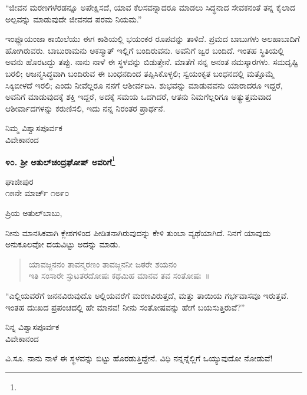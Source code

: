 “ಜೀವನ ಮರಣಗಳೆರಡನ್ನೂ ಅಪೇಕ್ಷಿಸದೆ, ಯಾವ ಕೆಲಸವನ್ನಾದರೂ ಮಾಡಲು ಸಿದ್ಧನಾದ ಸೇವಕನಂತೆ ತನ್ನ ಕೈಲಾದ ಅಲ್ಪವನ್ನು ಮಾಡುವುದೇ ಜೀವನದ ಪರಮ ನಿಯಮ.''

ಇಂಫ್ಲೂಯಂಜಾ ಕಾಯಿಲೆಯು ಈಗ ಕಾಶಿಯಲ್ಲಿ ಭಯಂಕರ ರೂಪವನ್ನು ತಾಳಿದೆ. ಪ್ರಮದ ಬಾಬುಗಳು ಅಲಹಾಬಾದಿಗೆ ಹೋಗಿರುವರು. ಬಾಬುರಾಮನು ಅಕಸ್ಮಾತ್ ಇಲ್ಲಿಗೆ ಬಂದಿರುವನು. ಅವನಿಗೆ ಜ್ವರ ಬಂದಿದೆ. ಇಂತಹ ಸ್ಥಿತಿಯಲ್ಲಿ ಅವನು ಹೊರಟದ್ದು ತಪ್ಪು. ನಾನು ನಾಳೆ ಈ ಸ್ಥಳವನ್ನು ಬಿಡುತ್ತೇನೆ. ಮಾತೆಗೆ ನನ್ನ ಅನಂತ ನಮಸ್ಕಾರಗಳು. ಸಮದೃಷ್ಟಿ ಬರಲಿ; ಆಜನ್ಮಸಿದ್ಧವಾಗಿ ಬಂದಿರುವ ಈ ಬಂಧನದಿಂದ ತಪ್ಪಿಸಿಕೊಳ್ಳಲಿ; ಸ್ವಯಂಕೃತ ಬಂಧನದಲ್ಲಿ ಮತ್ತೊಮ್ಮೆ ಸಿಕ್ಕಿಬೀಳದೆ ಇರಲಿ; ಎಂದು ನೀವೆಲ್ಲರೂ ನನಗೆ ಆಶೀರ್ವದಿಸಿ. ಶುಭವನ್ನು ಮಾಡುವವನು ಯಾರಾದರೂ ಇದ್ದರೆ, ಅವನಿಗೆ ಮಾಡುವುದಕ್ಕೆ ಶಕ್ತಿ ಇದ್ದರೆ, ಅದಕ್ಕೆ ಸಮಯ ಒದಗಿದರೆ, ಆತನು ನಿಮಗೆಲ್ಲರಿಗೂ ಅತ್ಯುತ್ತಮವಾದ ಆಶೀರ್ವಾದಗಳನ್ನು ಕರುಣಿಸಲಿ, ಇದು ನನ್ನ ನಿರಂತರ ಪ್ರಾರ್ಥನೆ.

\vspace{-0.5cm}

{\flushright
ನಿಮ್ಮ ವಿಶ್ವಾಸಪೂರ್ವಕ\\ವಿವೇಕಾನಂದ\par}

\begin{center}
\textbf{೪೦. ಶ‍್ರೀ ಅತುಲ್‌ಚಂದ್ರಘೋಷ್ ಅವರಿಗೆ}\footnote{}
\end{center}

\vspace{-0.5cm}

\begin{flushright}
ಘಾಜೀಪುರ\\೧೫ನೇ ಮಾರ್ಚ್ ೧೮೯೦
\end{flushright}

\noindent
ಪ್ರಿಯ ಅತುಲ್‌ಬಾಬು,

ನೀನು ಮಾನಸಿಕವಾಗಿ ಕ್ಲೇಶಗಳಿಂದ ಪೀಡಿತನಾಗಿರುವುದನ್ನು ಕೇಳಿ ತುಂಬಾ ವ್ಯಥೆಯಾಗಿದೆ. ನಿನಗೆ ಯಾವುದು ಅನುಕೂಲವೋ ದಯವಿಟ್ಟು ಅದನ್ನು ಮಾಡು.
\begin{verse}
 ಯಾವಜ್ಜನನಂ ತಾವನ್ಮರಣಂ ತಾವಜ್ಜನನೀ ಜಠರೇ ಶಯನಂ\\
 ಇತಿ ಸಂಸಾರೇ ಸ್ಫುಟತರದೋಷಃ ಕಥಮಿಹ ಮಾನವ ತವ ಸಂತೋಷಃ~॥ 
\end{verse}

“ಎಲ್ಲಿಯವರೆಗೆ ಜನನವಿರುವುದೊ ಅಲ್ಲಿಯವರೆಗೆ ಮರಣವಿರುತ್ತದೆ, ಮತ್ತು ತಾಯಿಯ ಗರ್ಭವಾಸವೂ ಇರುತ್ತವೆ. ಇಂತಹ ದುಃಖದ ಪ್ರಪಂಚದಲ್ಲಿ ಹೇ ಮಾನವ! ನೀನು ಸಂತೋಷವನ್ನು ಹೇಗೆ ಬಯಸುತ್ತಿರುವೆ?”

\vspace{-0.5cm}

\begin{flushright}
ನಿನ್ನ ವಿಶ್ವಾಸಪೂರ್ವಕ\\ವಿವೇಕಾನಂದ
\end{flushright}

ವಿ.ಸೂ. \enginline{-}ನಾನು ನಾಳೆ ಈ ಸ್ಥಳವನ್ನು ಬಿಟ್ಟು ಹೊರಡುತ್ತಿದ್ದೇನೆ. ವಿಧಿ ನನ್ನನ್ನೆಲ್ಲಿಗೆ ಒಯ್ಯುವುದೋ ನೋಡುವೆ!

